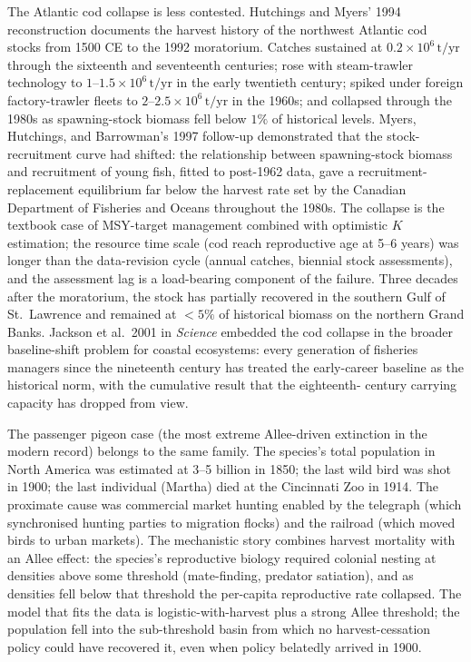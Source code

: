 The Atlantic cod collapse is less contested. Hutchings and Myers'
1994 reconstruction \cite[pp.~2126--2146]{paper:v6c08-hutchings-cod-1996}
documents the harvest history of the northwest Atlantic cod stocks
from 1500 CE to the 1992 moratorium. Catches sustained at
$0.2 \times 10^6\,\text{t}/\text{yr}$ through the sixteenth and
seventeenth centuries; rose with steam-trawler technology to
$1$--$1.5 \times 10^6\,\text{t}/\text{yr}$ in the early twentieth
century; spiked under foreign factory-trawler fleets to $2$--$2.5
\times 10^6\,\text{t}/\text{yr}$ in the 1960s; and collapsed
through the 1980s as spawning-stock biomass fell below $1\%$ of
historical levels. Myers, Hutchings, and Barrowman's 1997 follow-up
\cite[pp.~91--106]{paper:v6c08-myers-cod-1994} demonstrated that the
stock-recruitment curve had shifted: the relationship between
spawning-stock biomass and recruitment of young fish, fitted to
post-1962 data, gave a recruitment-replacement equilibrium far below
the harvest rate set by the Canadian Department of Fisheries and
Oceans throughout the 1980s. The collapse is the textbook case of
MSY-target management combined with optimistic $K$ estimation;
the resource time scale (cod reach reproductive age at 5--6 years)
was longer than the data-revision cycle (annual catches, biennial
stock assessments), and the assessment lag is a load-bearing
component of the failure. Three decades after the moratorium, the
stock has partially recovered in the southern Gulf of St.\ Lawrence
and remained at $<5\%$ of historical biomass on the northern Grand
Banks. Jackson et al.\ 2001 in \emph{Science}
\cite[pp.~629--637]{paper:v6c08-jackson-marine-2001} embedded the
cod collapse in the broader baseline-shift problem for coastal
ecosystems: every generation of fisheries managers since the
nineteenth century has treated the early-career baseline as the
historical norm, with the cumulative result that the eighteenth-
century carrying capacity has dropped from view.

The passenger pigeon case (the most extreme Allee-driven extinction
in the modern record) belongs to the same family. The species's
total population in North America was estimated at 3--5 billion in
1850; the last wild bird was shot in 1900; the last individual
(Martha) died at the Cincinnati Zoo in 1914. The proximate cause was
commercial market hunting enabled by the telegraph (which
synchronised hunting parties to migration flocks) and the railroad
(which moved birds to urban markets). The mechanistic story
combines harvest mortality with an Allee effect: the species's
reproductive biology required colonial nesting at densities above
some threshold (mate-finding, predator satiation), and as densities
fell below that threshold the per-capita reproductive rate
collapsed. The model that fits the data is logistic-with-harvest
plus a strong Allee threshold; the population fell into the
sub-threshold basin from which no harvest-cessation policy could
have recovered it, even when policy belatedly arrived in 1900.


